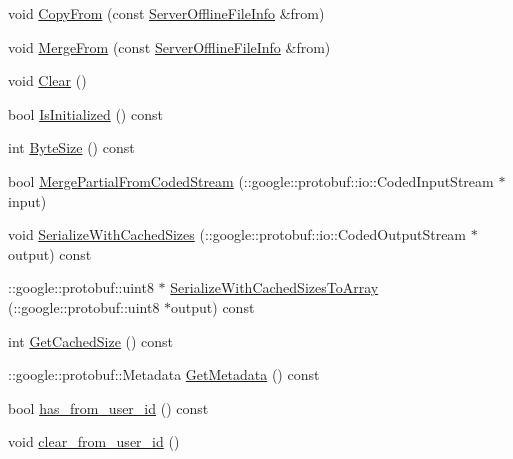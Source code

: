 \begin{DoxyCompactItemize}
\item 
void \hyperlink{class_i_m_1_1_base_define_1_1_server_offline_file_info_a79fd9ce230716c007bceeb5bc0e834c9}{Copy\+From} (const \hyperlink{class_i_m_1_1_base_define_1_1_server_offline_file_info}{Server\+Offline\+File\+Info} \&from)
\item 
void \hyperlink{class_i_m_1_1_base_define_1_1_server_offline_file_info_ae246ec60b82474f48b31977fbc0aa881}{Merge\+From} (const \hyperlink{class_i_m_1_1_base_define_1_1_server_offline_file_info}{Server\+Offline\+File\+Info} \&from)
\item 
void \hyperlink{class_i_m_1_1_base_define_1_1_server_offline_file_info_a887d33ad33e424fa0d918d86a849c636}{Clear} ()
\item 
bool \hyperlink{class_i_m_1_1_base_define_1_1_server_offline_file_info_a22c27081b75f562e9299138f929e25d3}{Is\+Initialized} () const 
\item 
int \hyperlink{class_i_m_1_1_base_define_1_1_server_offline_file_info_a8ce9857c5bf70ed18b50aeaec860fd99}{Byte\+Size} () const 
\item 
bool \hyperlink{class_i_m_1_1_base_define_1_1_server_offline_file_info_a172270e7bcf789e959df7c91c791dd66}{Merge\+Partial\+From\+Coded\+Stream} (\+::google\+::protobuf\+::io\+::\+Coded\+Input\+Stream $\ast$input)
\item 
void \hyperlink{class_i_m_1_1_base_define_1_1_server_offline_file_info_abda1d1b41cdd3280e66bbb6b1f10ed5c}{Serialize\+With\+Cached\+Sizes} (\+::google\+::protobuf\+::io\+::\+Coded\+Output\+Stream $\ast$output) const 
\item 
\+::google\+::protobuf\+::uint8 $\ast$ \hyperlink{class_i_m_1_1_base_define_1_1_server_offline_file_info_a771967d1416e63116d5e3f61f4f2d7a8}{Serialize\+With\+Cached\+Sizes\+To\+Array} (\+::google\+::protobuf\+::uint8 $\ast$output) const 
\item 
int \hyperlink{class_i_m_1_1_base_define_1_1_server_offline_file_info_a7ac78d7b8b53bb3051597aedf5decfb8}{Get\+Cached\+Size} () const 
\item 
\+::google\+::protobuf\+::\+Metadata \hyperlink{class_i_m_1_1_base_define_1_1_server_offline_file_info_afea8c6e31d302b66994f6d01992abe88}{Get\+Metadata} () const 
\item 
bool \hyperlink{class_i_m_1_1_base_define_1_1_server_offline_file_info_a08da24fcfac7b9955e62fba9279725f2}{has\+\_\+from\+\_\+user\+\_\+id} () const 
\item 
void \hyperlink{class_i_m_1_1_base_define_1_1_server_offline_file_info_a61e1bd64d505aa5d66cb6d7f757bc439}{clear\+\_\+from\+\_\+user\+\_\+id} ()

\end{DoxyCompactItemize}
